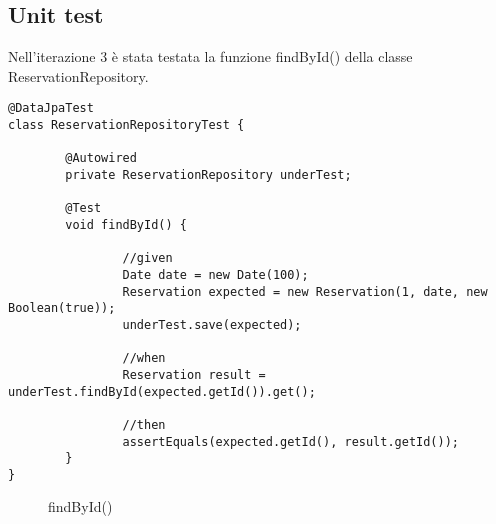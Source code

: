 \subsection{Unit test}
Nell'iterazione 3 è stata testata la funzione findById() della classe ReservationRepository.

\begin{lstlisting}
@DataJpaTest
class ReservationRepositoryTest {

        @Autowired
        private ReservationRepository underTest;

        @Test
        void findById() {

                //given
                Date date = new Date(100);
                Reservation expected = new Reservation(1, date, new Boolean(true));
                underTest.save(expected);

                //when
                Reservation result = underTest.findById(expected.getId()).get();

                //then
                assertEquals(expected.getId(), result.getId());
        }
}
\end{lstlisting}

\begin{figure}[h!]
\begin{center}

  \caption{findById()}
\end{center}
\end{figure}